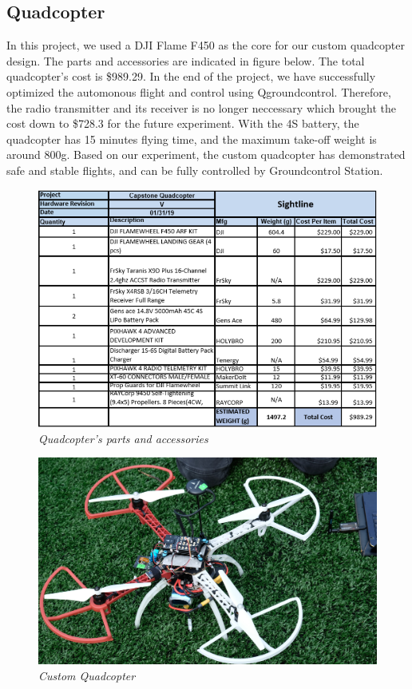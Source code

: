 \documentclass[11pt]{article}
\begin{document}
\subsection{Quadcopter}

In this project, we used a DJI Flame F450 as the core for our custom quadcopter design. The parts and accessories are indicated in figure below. The total quadcopter's cost is \$989.29. In the end of the project, we have successfully optimized the automonous flight and control using Qgroundcontrol. Therefore, the radio transmitter and its receiver is no longer neccessary which brought the cost down to \$728.3 for the future experiment. \newline 
With the 4S battery, the quadcopter has 15 minutes flying time, and the maximum take-off weight is  around 800g. Based on our experiment, the custom quadcopter has demonstrated safe and stable flights, and can be fully controlled by Groundcontrol Station.  
\newpage
\begin{figure}[h!bt]
\centering	
\includegraphics[width=7 in]{quadcopter_part}
\caption{\textit{Quadcopter's parts and accessories}}	
\end{figure} 

\begin{figure}[h!bt]
\centering	
\includegraphics[width=4.5 in]{quad}
\caption{\textit{Custom Quadcopter}}	
\end{figure}
\end{document}
